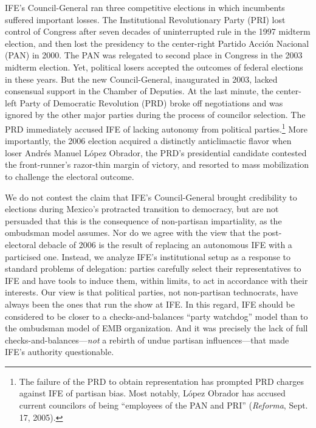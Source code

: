 \documentclass[12 pt, letter]{article}
\begin{document}
IFE's Council-General ran three competitive elections in which incumbents suffered important losses. The Institutional Revolutionary Party (PRI) lost control of Congress after seven decades of uninterrupted rule in the 1997 midterm election, and then lost the presidency to the center-right Partido Acci\'on Nacional (PAN) in 2000. The PAN was relegated to second place in Congress in the 2003 midterm election. Yet, political losers accepted the outcomes of federal elections in these years.  But the new Council-General, inaugurated in 2003, lacked consensual support in the Chamber of Deputies.  At the last minute, the center-left Party of Democratic Revolution (PRD) broke off negotiations and was ignored by the other major parties during the process of  councilor selection.  The PRD immediately accused IFE of lacking autonomy from political parties.\footnote{The failure of the PRD to obtain representation has prompted PRD charges against IFE of partisan bias.  Most notably, L\'opez Obrador has accused current councilors of being ``employees of the PAN and PRI'' (\emph{Reforma}, Sept. 17, 2005).}  More importantly, the 2006 election acquired a distinctly anticlimactic flavor when loser Andr\'es Manuel L\'opez Obrador, the PRD's presidential candidate contested the front-runner's razor-thin margin of victory, and resorted to mass mobilization to challenge the electoral outcome.

We do not contest the claim that IFE's Council-General brought credibility to elections during Mexico's protracted transition to democracy, but are not persuaded that this is the consequence of non-partisan impartiality, as the ombudsman model assumes.    Nor do we agree with the view that the  post-electoral debacle of 2006 is the result of replacing an autonomous IFE with a particised one.  Instead, we analyze IFE's institutional setup as a response to standard problems of delegation: parties carefully select their representatives to IFE and have tools to induce them, within limits, to act in accordance with their interests. Our view is that political parties, not non-partisan technocrats, have always been the ones that run the show at IFE.  In this regard, IFE should be considered to be closer to a checks-and-balances ``party watchdog'' model than to the ombudsman model of EMB organization.  And it was precisely the lack of full checks-and-balances---\emph{not} a rebirth of undue partisan influences---that made IFE's authority questionable.
\end{document}

